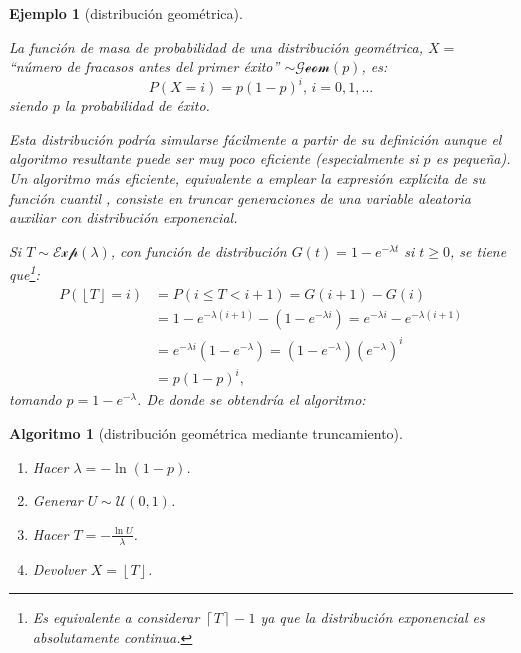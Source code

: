\documentclass[
  spanish,
  10pt,
]{book}
\theoremstyle{break}
\newtheorem{conjecture}{Algoritmo}[chapter]
\newtheorem{example}{Ejemplo}[chapter]
\theoremstyle{nonumberplain}
\let\oldfootnote\footnote
\renewcommand\footnote[1]{\oldfootnote{\hspace{2mm}#1}}
\begin{document}
\begin{example}[distribución geométrica]
\protect\hypertarget{exm:transcuant-directo}{}\label{exm:transcuant-directo}

La función de masa de probabilidad de una distribución geométrica, \(X =\) ``número de fracasos antes del primer éxito'' \(\sim \mathcal{Geom}(p)\), es:
\[P(X = i) = p(1-p)^i \text{, } i = 0, 1, \ldots\]
siendo \(p\) la probabilidad de éxito.

Esta distribución podría simularse fácilmente a partir de su definición aunque el algoritmo resultante puede ser muy poco eficiente (especialmente si \(p\) es pequeña).
Un algoritmo más eficiente, equivalente a emplear la expresión explícita de su función cuantil \citep[e.g.][sec.~4.1.2]{cao2002}, consiste en truncar generaciones de una variable aleatoria auxiliar con distribución exponencial.

Si \(T \sim \mathcal{Exp}(\lambda)\), con función de distribución \(G(t) = 1-e^{-\lambda t}\) si \(t \geq 0\), se tiene que\footnote{Es equivalente a considerar \(\left\lceil T \right\rceil -1\) ya que la distribución exponencial es absolutamente continua.}:
\[\begin{aligned}
P\left( \left\lfloor T \right\rfloor = i \right) 
& = P(i \leq T < i + 1 ) = G(i + 1) - G(i) \\  
& = 1-e^{-\lambda (i+1)} - \left(1-e^{-\lambda i}\right)  = e^{-\lambda i} - e^{-\lambda (i+1)}\\
& = e^{-\lambda i }\left(1-e^{-\lambda}\right)  
= \left(1-e^{-\lambda}\right)  \left(e^{-\lambda}\right)^i \\
& = p(1-p)^i,
\end{aligned}\]
tomando \(p=1-e^{-\lambda}\).
De donde se obtendría el algoritmo:
\end{example}

\begin{conjecture}[distribución geométrica mediante truncamiento]
\protect\hypertarget{cnj:geometrica}{}\label{cnj:geometrica}

\begin{enumerate}
\def\labelenumi{\arabic{enumi}.}
\setcounter{enumi}{-1}
\item
  Hacer \(\lambda = -\ln(1 - p)\).
\item
  Generar \(U \sim \mathcal{U}(0, 1)\).
\item
  Hacer \(T = -\frac{\ln U}{\lambda}\).
\item
  Devolver \(X = \left\lfloor T \right\rfloor\).
\end{enumerate}

\end{conjecture}
\end{document}
